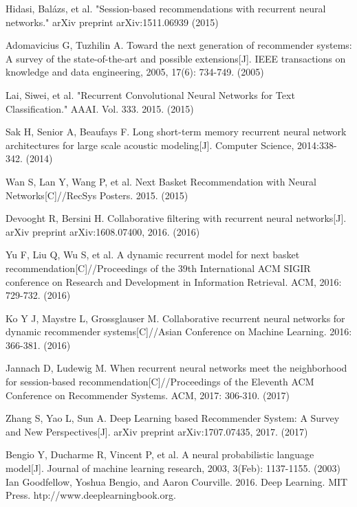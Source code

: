 \documentclass[runningheads]{llncs}
\begin{document}
\begin{thebibliography}{8}
 Hidasi, Balázs, et al. "Session-based recommendations with recurrent neural networks." arXiv preprint arXiv:1511.06939 (2015)

 Adomavicius G, Tuzhilin A. Toward the next generation of recommender systems: A survey of the state-of-the-art and possible extensions[J]. IEEE transactions on knowledge and data engineering, 2005, 17(6): 734-749. (2005)

 Lai, Siwei, et al. "Recurrent Convolutional Neural Networks for Text Classification." AAAI. Vol. 333. 2015. (2015)

 Sak H, Senior A, Beaufays F. Long short-term memory recurrent neural network architectures for large scale acoustic modeling[J]. Computer Science, 2014:338-342. (2014)

 Wan S, Lan Y, Wang P, et al. Next Basket Recommendation with Neural Networks[C]//RecSys Posters. 2015. (2015)

 Devooght R, Bersini H. Collaborative filtering with recurrent neural networks[J]. arXiv preprint arXiv:1608.07400, 2016. (2016)

 Yu F, Liu Q, Wu S, et al. A dynamic recurrent model for next basket recommendation[C]//Proceedings of the 39th International ACM SIGIR conference on Research and Development in Information Retrieval. ACM, 2016: 729-732. (2016)

 Ko Y J, Maystre L, Grossglauser M. Collaborative recurrent neural networks for dynamic recommender systems[C]//Asian Conference on Machine Learning. 2016: 366-381. (2016)

 Jannach D, Ludewig M. When recurrent neural networks meet the neighborhood for session-based recommendation[C]//Proceedings of the Eleventh ACM Conference on Recommender Systems. ACM, 2017: 306-310. (2017)

 Zhang S, Yao L, Sun A. Deep Learning based Recommender System: A Survey and New Perspectives[J]. arXiv preprint arXiv:1707.07435, 2017. (2017)

 Bengio Y, Ducharme R, Vincent P, et al. A neural probabilistic language model[J]. Journal of machine learning research, 2003, 3(Feb): 1137-1155. (2003)
 Ian Goodfellow, Yoshua Bengio, and Aaron Courville. 2016. Deep Learning. MIT Press. htp://www.deeplearningbook.org.
\end{thebibliography}
\end{document}
